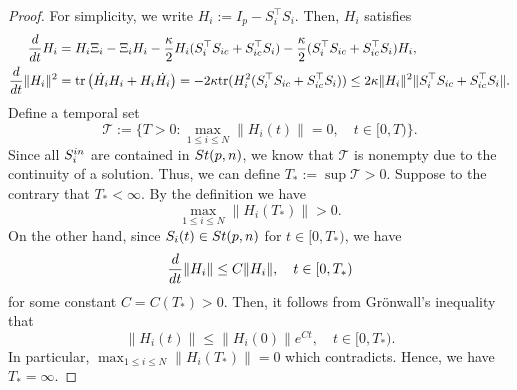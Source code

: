 \documentclass[10pt,a4paper]{amsart}
\newcommand{\St}{  {\textup{St}}(p,n) }
\newcommand{\dd}{  {\textup{d}} }
\newcommand{\dt} {    {  \textup{d}t   }    }
\newcommand{\init}{  {\textup{in}} }
\begin{document}
\begin{proof} 
For simplicity, we write $H_i := I_p - S_i^\top S_i$. Then, $H_i$ satisfies
\[
\begin{aligned}
\frac\dd\dt H_i%
&=H_i \Xi_i-\Xi_i H_i-\frac{\kappa}{2}H_i(S_i^\top S_{ic}+S_{ic}^\top S_i)-\frac{\kappa}{2}(S_i^\top S_{ic}+S_{ic}^\top S_i)H_i,\\
\frac \dd\dt \|H_i\|^2&=\mbox{tr}\left(\dot{H_i}H_i+H_i\dot{H_i}\right)=-2\kappa\mbox{tr}(H_i^2(S_i^\top S_{ic}+S_{ic}^\top S_i))\leq 2\kappa \|H_i\|^2\|S_i^\top S_{ic}+S_{ic}^\top S_i\|.
\end{aligned}%
\]
Define a temporal set 
\[
\mathcal T := \{ T>0: \max_{1\leq i \leq N } \|H_i(t)\| = 0,\quad t\in [0,T) \}.
\]
Since all $S_i^\init$ are contained in $\St$, we know that $\mathcal T$ is nonempty due to the continuity of a solution. Thus, we can define $T_*:= \sup \mathcal T>0$. Suppose to the contrary that $T_*<\infty$. By the definition we have
\[
\max_{1\leq i \leq N } \|H_i (T_*)\|>0.
\]
On the other hand, since $S_i(t) \in \St$ for $t\in [0,T_*)$, we have
\[
\frac\dd\dt \|H_i\| \leq C \|H_i\|,\quad t\in [0,T_*)
\]
for some constant $C=C(T_*)>0$. Then, it follows from Gr\"onwall's inequality that 
\[
\|H_i(t) \| \leq \|H_i(0)\|e^{Ct}, \quad t\in [0,T_*).
\]
In particular, $\max_{1\leq i \leq N} \|H_i(T_*)\| =0$ which contradicts. Hence, we have $T_* = \infty$. 
\end{proof}
\end{document}
